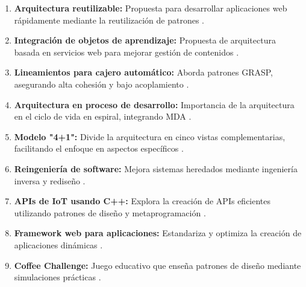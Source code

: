 \documentclass[twocolumn]{article}
\begin{document}
\begin{enumerate}
    \item \textbf{Arquitectura reutilizable:} Propuesta para desarrollar aplicaciones web rápidamente mediante la reutilización de patrones \cite{murillo2019}.
    \item \textbf{Integración de objetos de aprendizaje:} Propuesta de arquitectura basada en servicios web para mejorar gestión de contenidos \cite{rojas2011}.
    \item \textbf{Lineamientos para cajero automático:} Aborda patrones GRASP, asegurando alta cohesión y bajo acoplamiento \cite{ortega2021}.
    \item \textbf{Arquitectura en proceso de desarrollo:} Importancia de la arquitectura en el ciclo de vida en espiral, integrando MDA \cite{meaurio2013}.
    \item \textbf{Modelo "4+1":} Divide la arquitectura en cinco vistas complementarias, facilitando el enfoque en aspectos específicos \cite{kruchten1995}.
    \item \textbf{Reingeniería de software:} Mejora sistemas heredados mediante ingeniería inversa y rediseño \cite{contreras2020}.
    \item \textbf{APIs de IoT usando C++:} Explora la creación de APIs eficientes utilizando patrones de diseño y metaprogramación \cite{pacheco2020}.
    \item \textbf{Framework web para aplicaciones: }Estandariza y optimiza la creación de aplicaciones dinámicas \cite{villalobos2010}.
    \item \textbf{Coffee Challenge:} Juego educativo que enseña patrones de diseño mediante simulaciones prácticas \cite{castano2020}.
\end{enumerate}
\end{document}
